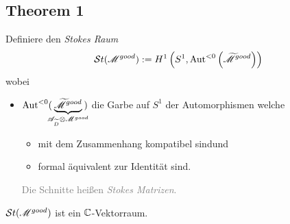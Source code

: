 
\pagebreak \subsection{Theorem 1} %
\begin{comment}
  see:
  \begin{itemize}
    \item \cite[29]{Varadarajan96linearmeromorphic}
  \end{itemize}
\end{comment}
\begin{defn}
  Definiere den \emph{Stokes Raum}
  \[
    \mathcal{S}{}t(\mathscr{M}^{good})
      :=H^1\left(S^1,\operatorname{Aut}^{<0}\left(\widetilde {\mathscr{M}}^{good}\right)\right)
  \]
  wobei
  \begin{itemize}
    \item $\operatorname{Aut}^{<0}(\!\!\!\underset{\mathscr{A}_{\widetilde D}\otimes\mathscr{M}^{good}}
      {\underbrace{\widetilde{\mathscr{M}}^{good}}}\!\!\!)$
      die Garbe auf $S^1$ der Automorphismen welche
      \begin{itemize}
        \item mit dem Zusammenhang kompatibel sind\TODO und
        \item formal äquivalent zur Identität sind.
      \end{itemize}
      \textcolor{gray}{Die Schnitte heißen \emph{Stokes Matrizen}.}
  \end{itemize}
  \begin{thm}
    $\mathcal{S}{}t(\mathscr{M}^{good})$ ist ein $\mathbb{C}$-Vektorraum.
  \end{thm}
\end{defn}

